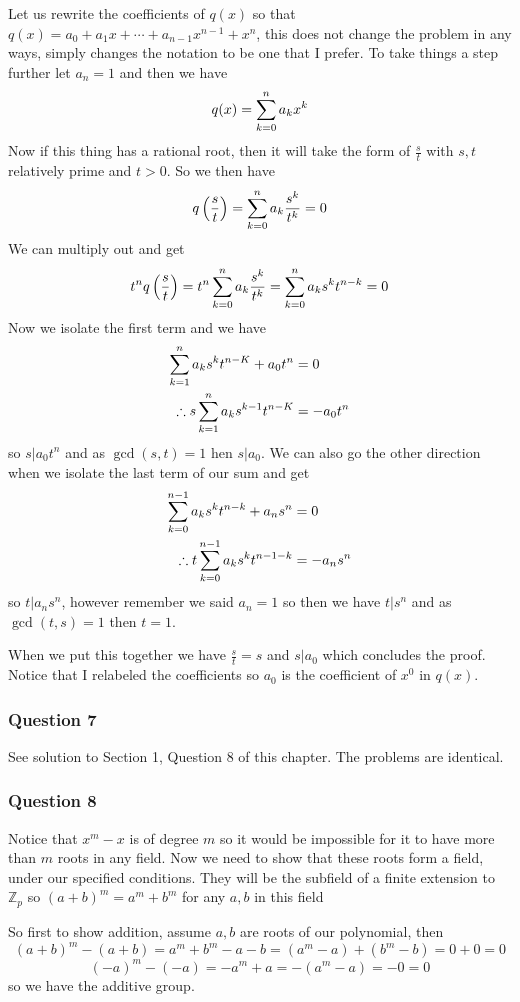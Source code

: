 \documentclass{article}
\begin{document}
Let us rewrite the coefficients of $q(x)$ so that $q(x) = a_0+a_1x+\cdots+a_{n-1}x^{n-1}+x^n$, this does not change the problem in any ways, simply changes the notation to be one that I prefer. To take things a step further let $a_n=1$ and then we have $$q(x)=\sum\limits_{k=0}^{n}  {a_kx^k} $$ Now if this thing has a rational root, then it will take the form of $\frac st$ with $s,t$ relatively prime and $t>0$. So we then have $$q\left(\frac st\right)=\sum\limits_{k=0}^{n}  {a_k\frac{s^k}{t^k}}  = 0$$ We can multiply out and get $$t^nq\left(\frac st\right) = t^n\sum\limits_{k=0}^{n}  {a_k\frac{s^k}{t^k}}  = \sum\limits_{k=0}^{n}  {a_ks^kt^{n-k}}  = 0$$
Now we isolate the first term and we have
\begin{align*}
\sum\limits_{k=1}^{n}  {a_ks^kt^{n-K}} +a_0t^n &= 0\\
\therefore s\sum\limits_{k=1}^{n}  {a_ks^{k-1}t^{n-K}} & =-a_0t^n
\end{align*}
so $s|a_0t^n$ and as $\gcd(s,t) = 1$ hen $s|a_0$. We can also go the other direction when we isolate the last term of our sum and get
\begin{align*}
\sum\limits_{k=0}^{n-1}  {a_ks^kt^{n-k}} +a_ns^n &= 0\\
\therefore t\sum\limits_{k=0}^{n-1}  {a_ks^kt^{n-1-k}} &=-a_ns^n
\end{align*}
so $t|a_ns^n$, however remember we said $a_n=1$ so then we have $t|s^n$ and as $\gcd(t,s) = 1$ then $t=1$.

When we put this together we have $\frac st = s$ and $s|a_0$ which concludes the proof. Notice that I relabeled the coefficients so $a_0$ is the coefficient of $x^0$ in $q(x)$.

\subsubsection{Question 7}

See solution to Section 1, Question 8 of this chapter. The problems are identical.

\subsubsection{Question 8}
Notice that $x^m-x$ is of degree $m$ so it would be impossible for it to have more than $m$ roots in any field. Now we need to show that these roots form a field, under our specified conditions. They will be the subfield of a finite extension to $\mathbb Z_p$ so  $(a+b)^m = a^m+b^m$ for any $a,b$ in this field

So first to show addition, assume $a,b$ are roots of our polynomial, then $$(a+b)^m -(a+b) = a^m+b^m-a-b=(a^m-a)+(b^m-b)=0+0=0$$
$$(-a)^m-(-a) = -a^m+a=-(a^m-a) = -0=0$$ so we have the additive group.
\end{document}
